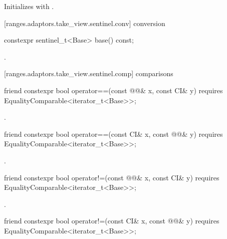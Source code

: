 \begin{itemdescr}
\pnum
\effects Initializes  with .
\end{itemdescr}

[ranges.adaptors.take_view.sentinel.conv]{ conversion}

\begin{itemdecl}
constexpr sentinel_t<Base> base() const;
\end{itemdecl}

\begin{itemdescr}
\pnum
\returns {}.
\end{itemdescr}

[ranges.adaptors.take_view.sentinel.comp]{ comparisons}

\begin{itemdecl}
friend constexpr bool operator==(const @@& x, const CI& y)
  requires EqualityComparable<iterator_t<Base>>;
\end{itemdecl}

\begin{itemdescr}
\pnum
\returns {}.
\end{itemdescr}

\begin{itemdecl}
friend constexpr bool operator==(const CI& x, const @@& y)
  requires EqualityComparable<iterator_t<Base>>;
\end{itemdecl}

\begin{itemdescr}
\pnum
\returns {}.
\end{itemdescr}

%
\begin{itemdecl}
friend constexpr bool operator!=(const @@& x, const CI& y)
  requires EqualityComparable<iterator_t<Base>>;
\end{itemdecl}

\begin{itemdescr}
\pnum
\returns {}.
\end{itemdescr}

\begin{itemdecl}
friend constexpr bool operator!=(const CI& x, const @@& y)
  requires EqualityComparable<iterator_t<Base>>;
\end{itemdecl}

